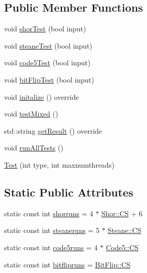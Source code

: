 \subsection*{Public Member Functions}
\begin{DoxyCompactItemize}
\item 
void \hyperlink{class_test_aac2e651b089febf2cd5ab1b5d2874c5a}{shor\+Test} (bool input)
\item 
void \hyperlink{class_test_a9bac2c6bc99fbb7f54b79712006956c0}{steane\+Test} (bool input)
\item 
void \hyperlink{class_test_a784d32490d6aa0bf8909d6a1cad5ee33}{code5\+Test} (bool input)
\item 
void \hyperlink{class_test_a89dd7059b847c8429636007515cd42ac}{bit\+Flip\+Test} (bool input)
\item 
void \hyperlink{class_test_a6baf4b2ddf84f198e156bf78c97b865b}{initalize} () override
\item 
void \hyperlink{class_test_afd06ee055f93c52fca29ffd2266b5564}{test\+Mixed} ()
\item 
std\+::string \hyperlink{class_test_ae53178c2e482ed3a869c742387521a60}{get\+Result} () override
\item 
void \hyperlink{class_test_a2616b0b705d644091904f3de58eb46bb}{run\+All\+Tests} ()
\item 
\hyperlink{class_test_ab61976fd1ea38385bd4260d433f930c0}{Test} (int type, int maxnumthreads)
\end{DoxyCompactItemize}
\subsection*{Static Public Attributes}
\begin{DoxyCompactItemize}
\item 
static const int \hyperlink{class_test_af926faddaa7288d10542e78bc1be29f6}{shorruns} = 4 $\ast$ \hyperlink{class_shor_a5c2bb5ad73004577f8781a001eda8b8f}{Shor\+::\+CS} + 6
\item 
static const int \hyperlink{class_test_a1f5e5c6be1ad2c4459ad702c254c72a1}{steaneruns} = 5 $\ast$ \hyperlink{class_steane_a3b81ad6daffc03833cea9c333f2cd927}{Steane\+::\+CS}
\item 
static const int \hyperlink{class_test_af99add0cf16991621c26ea17bd38d41d}{code5runs} = 4 $\ast$ \hyperlink{class_code5_ac252f1c41568341657456564d0417630}{Code5\+::\+CS}
\item 
static const int \hyperlink{class_test_af4a50e78867431da5e5b8cf5110645aa}{bitflipruns} = \hyperlink{class_bit_flip_a8f5442dd93f87ea35fcb0b0bb423bbf0}{Bit\+Flip\+::\+CS}
\end{DoxyCompactItemize}
